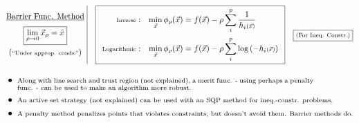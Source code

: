 \documentclass[12pt]{article}
\begin{document}
\vspace{10pt}
\( 
    \begin{gathered}
        \underline{\text{Barrier Func. Method}}\\[2pt]
        \boxed{ \lim_{\rho \rightarrow 0} \vec{x}_\rho = \bar{x} }\\
        (\text{\scriptsize ``Under approp. conds.''})
    \end{gathered}
    \ \vline \ \ \ 
    \boxed{
        \begin{array}{r l}
            \begin{gathered}
                \text{\scriptsize Inverse}
            \end{gathered} :
                &\displaystyle \min_{\vec{x}} \phi_\rho(\vec{x}) = f(\vec{x}) 
                - \rho \sum_i^p \frac{1}{ h_i{\scriptstyle(\vec{x})} }
                \\[15pt]
            \begin{gathered}
                \text{\scriptsize Logarithmic}
            \end{gathered} :
                &\displaystyle \min_{\vec{x}} \phi_\rho(\vec{x}) = f(\vec{x}) 
                - \rho \sum_i^p \log{ ( -h_i{\scriptstyle(\vec{x})} ) }
        \end{array}
    }
    \hspace{10pt}
    \boxed{ \text{\scriptsize(For Ineq. Constr.)} }
\)

\vspace{5pt}
\(\begin{aligned}
    &\bullet\ \parbox[t]{.95\textwidth}{\scriptsize Along with line search and trust region (not explained), 
        a merit func. - using perhaps a penalty func. - can be used to make an algorithm more robust.}
        \\
    &\bullet\ \text{\scriptsize An active set strategy (not explained) can be used with an SQP method 
        for ineq.-constr. problems.}
        \\
    &\bullet\ \text{\scriptsize A penalty method penalizes points that violates constraints, 
        but doesn't avoid them. Barrier methods do.}
\end{aligned}\)

\end{document}
